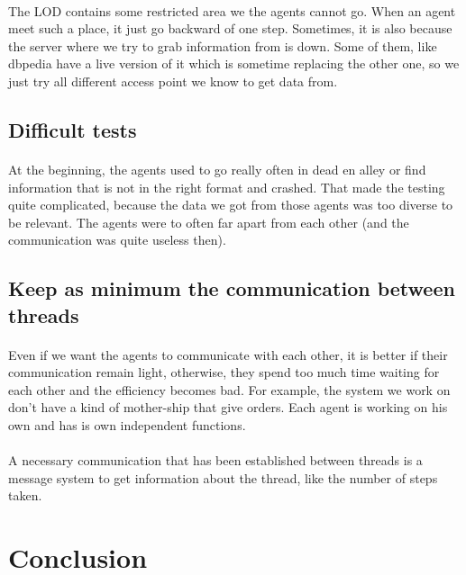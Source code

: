 \documentclass{article}
\begin{document}
		\paragraph{}
			The LOD contains some restricted area we the agents cannot go.
			When an agent meet such a place, it just go backward of one step.
			Sometimes, it is also because the server where we try to grab information from is down.
			Some of them, like dbpedia have a live version of it which is sometime replacing the other one,
			so we just try all different access point we know to get data from.
	\subsection{Difficult tests}
		\paragraph{}
			At the beginning, the agents used to go really often in dead en alley
			or find information that is not in the right format and crashed.
			That made the testing quite complicated, because the data we got from those agents was too diverse to be relevant.
			The agents were to often far apart from each other (and the communication was quite useless then).
		\subsection{Keep as minimum the communication between threads}
		\paragraph{}
			Even if we want the agents to communicate with each other, it is better if their communication remain light,
			otherwise, they spend too much time waiting for each other and the efficiency becomes bad.
			For example, the system we work on don't have a kind of mother-ship that give orders.
			Each agent is working on his own and has is own independent functions.
		\paragraph{}
			A necessary communication that has been established between threads is a message system to get information about the thread,
			like the number of steps taken.

\newpage
\section{Conclusion}
\end{document}
